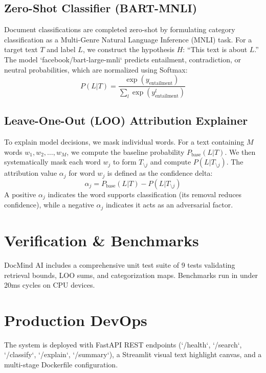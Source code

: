\documentclass[11pt,journal,onecolumn]{IEEEtran}
\begin{document}
\subsection{Zero-Shot Classifier (BART-MNLI)}
Document classifications are completed zero-shot by formulating category classification as a Multi-Genre Natural Language Inference (MNLI) task. For a target text $T$ and label $L$, we construct the hypothesis $H$: ``This text is about $L$.'' The model `facebook/bart-large-mnli` predicts entailment, contradiction, or neutral probabilities, which are normalized using Softmax:
\begin{equation}
P(L|T) = \frac{\exp(y_{\text{entailment}})}{\sum_{l} \exp(y_{\text{entailment}}^l)}
\end{equation}

\subsection{Leave-One-Out (LOO) Attribution Explainer}
To explain model decisions, we mask individual words. For a text containing $M$ words $w_1, w_2, \dots, w_M$, we compute the baseline probability $P_{\text{base}}(L|T)$. We then systematically mask each word $w_j$ to form $T_{\setminus j}$ and compute $P(L|T_{\setminus j})$. The attribution value $\alpha_j$ for word $w_j$ is defined as the confidence delta:
\begin{equation}
\alpha_j = P_{\text{base}}(L|T) - P(L|T_{\setminus j})
\end{equation}
A positive $\alpha_j$ indicates the word supports classification (its removal reduces confidence), while a negative $\alpha_j$ indicates it acts as an adversarial factor.

\section{Verification \& Benchmarks}
DocMind AI includes a comprehensive unit test suite of 9 tests validating retrieval bounds, LOO sums, and categorization maps.
Benchmarks run in under 20ms cycles on CPU devices.

\section{Production DevOps}
The system is deployed with FastAPI REST endpoints (`/health`, `/search`, `/classify`, `/explain`, `/summary`), a Streamlit visual text highlight canvas, and a multi-stage Dockerfile configuration.
\end{document}
